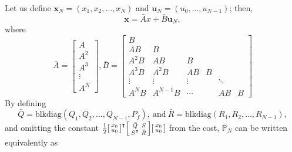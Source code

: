 \documentclass[a4paper,11pt,reqno]{amsart}
\newcommand{\tran}{\intercal}
\begin{document}
Let us define $\bm{x}_N = (x_1, x_2,\ldots, x_N)$ and $\bm{u}_N = (u_0,\ldots, u_{N-1})$; then,
\begin{equation}
    \bm{x}=\bar{A}x+\bar{B}\bm{u}_N,
\end{equation}
where
\begin{equation}
    \bar{A}=
    \begin{bmatrix}
        A
        \\
        A^2
        \\
        A^3
        \\
        \vdots
        \\
        A^N
    \end{bmatrix},
    \bar{B}=
    \begin{bmatrix}
        B
        \\
        AB&B
        \\
        A^2B&AB&B
        \\
        A^3B&A^2B&AB&B
        \\
        \vdots&\vdots&\vdots&&\ddots
        \\
        A^NB&A^{N-1}B&\cdots&&AB&B
    \end{bmatrix}
\end{equation}
By defining
\begin{equation}
    \bar{Q}=\mathrm{blkdiag}(Q_1,Q_2,\ldots,Q_{N-1},P_f),\ \text{and}\ \bar{R}=\mathrm{blkdiag}(R_1,R_2,\ldots,R_{N-1}),
\end{equation}
and omitting the constant $\tfrac{1}{2}
\begin{bsmallmatrix}
    x_0\\
    u_0
\end{bsmallmatrix}^{\tran}
\begin{bsmallmatrix}
    \bar{Q}&S\\
    S^{\tran}&\bar{R}
\end{bsmallmatrix}
\begin{bsmallmatrix}
    x_0\\
    u_0
\end{bsmallmatrix}$ from the cost, $\mathbb{P}_N$ can be written equivalently as
\end{document}
